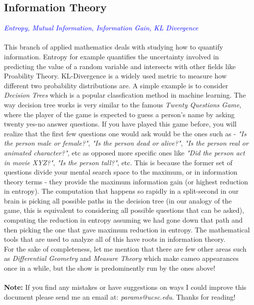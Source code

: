 \documentclass[a4paper]{article}
\begin{document}
\subsection{Information Theory}
\textcolor{blue}{\textit{Entropy, Mutual Information, Information Gain, KL Divergence}} \\ \\
This branch of applied mathematics deals with studying how to quantify information. Entropy for example quantifies the uncertainty involved in predicting the value of a random variable and intersects with other fields like Proability Theory. KL-Divergence is a widely used metric to measure how different two probability distributions are. A simple example is to consider \textit{Decision Trees} which is a popular classfication method in machine learning. The way decision tree works is very similar to the famous \textit{Twenty Questions Game}, where the player of the game is expected to guess a person's name by asking twenty yes-no answer questions. If you have played this game before, you will realize that the first few questions one would ask would be the ones such as - \textit{"Is the person male or female?"}, \textit{"Is the person dead or alive?"}, \textit{"Is the person real or animated character?"}, etc as opposed more specific ones like \textit{"Did the person act in movie XYZ?"}, \textit{"Is the person tall?"}, etc. This is because the former set of questions divide your mental search space to the maximum, or in information theory terms - they provide the maximum information gain (or highest reduction in entropy). The computation that happens so rapidly in a split-second in our brain is picking all possible paths in the decision tree (in our analogy of the game, this is equivalent to considering all possible questions that can be asked), computing the reduction in entropy assuming we had gone down that path and then picking the one that gave maximum reduction in entropy. The mathematical tools that are used to analyze all of this have roots in information theory.\\

\noindent For the sake of completeness, let me mention that there are few other areas such as {\it Differential Geometry} and {\it Measure Theory} which make cameo appearances once in a while, but the show is predominently run by the ones above! \\ \\

\noindent \textbf{Note:} If you find any mistakes or have suggestions on ways I could improve this document please send me an email at: \textit{params@ucsc.edu}. Thanks for reading!

%
%
\end{document}
